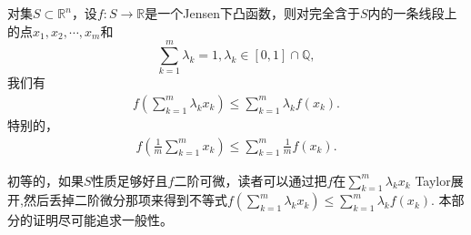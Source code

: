 \documentclass[../../main.tex]{subfiles}%
\begin{document}
\begin{theorem}[Jensen不等式]\label{theorem:Jensen不等式1111}
对集\(S\subset\mathbb{R}^n\)，设\(f:S\to\mathbb{R}\)是一个Jensen下凸函数，则对完全含于\(S\)内的一条线段上的点\(x_1,x_2,\cdots,x_m\)和
\[\sum_{k = 1}^{m}\lambda_k = 1,\lambda_k\in[0,1]\cap\mathbb{Q},\]
我们有
\begin{align}
f\left(\sum_{k = 1}^{m}\lambda_kx_k\right)\leqslant\sum_{k = 1}^{m}\lambda_kf(x_k).\label{equation-Jensen不等式} 
\end{align}
特别的，
\begin{align}
f\left(\frac{1}{m}\sum_{k = 1}^{m}x_k\right)\leqslant\sum_{k = 1}^{m}\frac{1}{m}f(x_k).\label{equation-Jensen不等式特例}
\end{align}
\end{theorem}
\begin{note}
初等的，如果\(S\)性质足够好且\(f\)二阶可微，读者可以通过把\(f\)在\(\sum_{k = 1}^{m}\lambda_kx_k\) Taylor展开,然后丢掉二阶微分那项来得到不等式$f\left(\sum_{k = 1}^{m}\lambda_kx_k\right)\leqslant\sum_{k = 1}^{m}\lambda_kf(x_k)$. 本部分的证明尽可能追求一般性。
\end{note}
\end{document}
